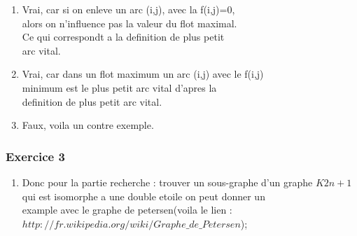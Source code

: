 \documentclass[]{article}
\begin{document}
\begin{enumerate}
\begin{enumerate}


\item Vrai, car si on enleve un arc (i,j), avec la f(i,j)=0,\\ alors on n'influence pas la valeur du flot maximal.\\
Ce qui correspondt a la definition de plus petit \\arc vital.

\item Vrai, car dans un flot maximum un arc (i,j) avec le f(i,j)\\ minimum est le plus petit arc vital d'apres la \\
definition de plus petit arc vital.
\item Faux, voila un contre exemple.


\usetikzlibrary{arrows}
\thispagestyle{empty}
\begin{center}
\end{center}
 
\end{enumerate} 
\subsubsection{Exercice 3}

\begin{enumerate}


\item Donc pour la partie recherche : trouver un sous-graphe d'un graphe $K2n+1$ qui est isomorphe a une double etoile on peut donner un\\
example avec le graphe de petersen(voila le lien : $http://fr.wikipedia.org/wiki/Graphe\_de\_Petersen$);


\end{enumerate}
\end{enumerate}
\end{document}
